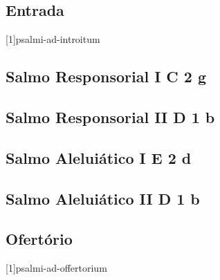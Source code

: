 
\subsection{Entrada}\label{subsection:missas-rituales/missa-in-professione-religiosa/introitus}
[1]{psalmi-ad-introitum}

\subsection[Salmo Responsorial I]{Salmo Responsorial I \textmd{C 2 g}}\label{subsection:missas-rituales/missa-in-professione-religiosa/psalmus-responsorius-1}

\AllowPageFlush

\subsection[Salmo Responsorial II]{Salmo Responsorial II \textmd{D 1 b}}\label{subsection:missas-rituales/missa-in-professione-religiosa/psalmus-responsorius-2}

\AllowPageFlush

\subsection[Salmo Aleluiático I]{Salmo Aleluiático I \textmd{E 2 d}}\label{subsection:missas-rituales/missa-in-professione-religiosa/psalmus-alleluiaticus-1}

\AllowPageFlush

\subsection[Salmo Aleluiático II]{Salmo Aleluiático II \textmd{D 1 b}}\label{subsection:missas-rituales/missa-in-professione-religiosa/psalmus-alleluiaticus-1}

\AllowPageFlush

\subsection{Ofertório}\label{subsection:missas-rituales/missa-in-professione-religiosa/offertorium}
[1]{psalmi-ad-offertorium}

